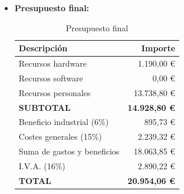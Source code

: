 \begin{itemize}
  \item \textbf{Presupuesto final:}
	\begin{table}[H]
	 \begin{center}
	  \begin{tabular}{|l|r|}
		\hline
		\textbf{Descripción} & \textbf{Importe} \\ 
		\hline
		Recursos hardware & 1.190,00 \euro \\
		\hline
		Recursos software & 0,00 \euro \\
		\hline
		Recursos personales & 13.738,80 \euro \\
		\hline
		\textbf{SUBTOTAL} & \textbf{14.928,80 \euro} \\
		\hline
		Beneficio industrial (6\%) & 895,73 \euro \\
		\hline
		Costes generales (15\%) & 2.239,32 \euro \\
		\hline
		Suma de gastos y beneficios & 18.063,85 \euro \\
		\hline
		I.V.A. (16\%) & 2.890,22 \euro \\
		\hline
		\textbf{TOTAL} & \Large\textbf{20.954,06 \euro} \\
		\hline
	  \end{tabular}
	  \caption{Presupuesto final}
	 \end{center}
	\end{table}

\end{itemize}
